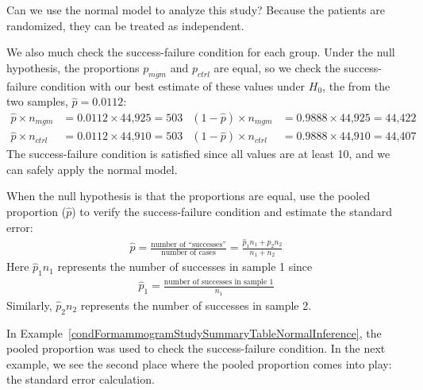 \begin{example}{Can we use the normal model to analyze this study?}\label{condFormammogramStudySummaryTableNormalInference}
Because the patients are randomized, they can be treated as independent.

We also much check the success-failure condition for each group. Under the null hypothesis, the proportions $p_{mgm}$ and $p_{ctrl}$ are equal, so we check the success-failure condition with our best estimate of these values under $H_0$, the  from the two samples, $\hat{p} = 0.0112$:
\begin{align*}
\hat{p} \times n_{mgm} &= 0.0112 \times \text{44,925} = 503
	& (1 - \hat{p}) \times n_{mgm} &= 0.9888 \times \text{44,925} = \text{44,422} \\
\hat{p} \times n_{ctrl} &= 0.0112 \times \text{44,910} = 503
	& (1 - \hat{p}) \times n_{ctrl} &= 0.9888 \times \text{44,910} = \text{44,407}
\end{align*}
The success-failure condition is satisfied since all values are at least 10, and we can safely apply the normal model.
\end{example}

\begin{termBox}{
When the null hypothesis is that the proportions are equal, use the pooled proportion ($\hat{p}$) to verify the success-failure condition and estimate the standard error:
\begin{eqnarray*}
\hat{p} = \frac{\text{number of ``successes''}}{\text{number of cases}} = \frac{\hat{p}_1n_1 + \hat{p}_2n_2}{n_1 + n_2}
\end{eqnarray*}
Here $\hat{p}_1n_1$ represents the number of successes in sample 1 since
\begin{eqnarray*}
\hat{p}_1 = \frac{\text{number of successes in sample 1}}{n_1}
\end{eqnarray*}
Similarly, $\hat{p}_2n_2$ represents the number of successes in sample 2.}
\end{termBox}

In Example~\ref{condFormammogramStudySummaryTableNormalInference}, the pooled proportion was used to check the success-failure condition. In the next example, we see the second place where the pooled proportion comes into play: the standard error calculation.


